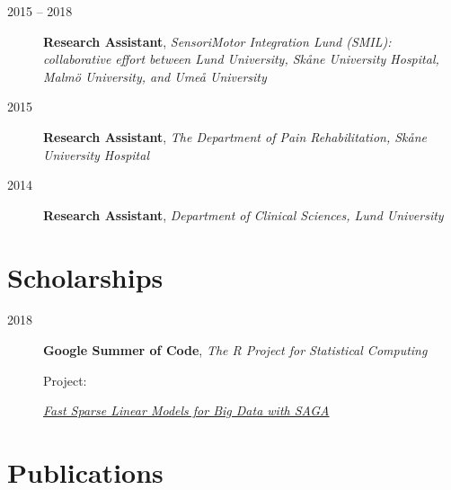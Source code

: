 \documentclass[
  10pt,
  headsepline=true,
  english,
  DIV=12
]{scrartcl}
\renewcommand*{%
  \mkbibnamegiven
}[1]{\ifitemannotation{highlight}{\textbf{#1}}{#1}}
\renewcommand*{%
  \mkbibnamefamily
}[1]{\ifitemannotation{highlight}{\textbf{#1}}{#1}}
\begin{document}
\begin{description}
  \item[2015 -- 2018] {
        \textbf{Research Assistant}, \emph{SensoriMotor Integration Lund
          (SMIL): collaborative effort between Lund University, Skåne
          University
          Hospital, Malmö University, and Umeå University}
        }
  \item[2015] {
        \textbf{Research Assistant}, \emph{The Department of Pain
          Rehabilitation, Skåne University Hospital}

        }
  \item[2014] {
        \textbf{Research Assistant}, \emph{Department of Clinical Sciences,
          Lund University}

        }
\end{description}

\section{Scholarships}
\begin{description}
  \item[2018] {
        \textbf{Google Summer of Code}, \emph{The R Project for Statistical
          Computing}

        Project:

        \emph{\href{https://summerofcode.withgoogle.com/archive/2018/projects/6276491595743232/}{Fast
            Sparse Linear Models for Big Data with SAGA}}
        }
\end{description}

\hypertarget{publications}{%
  \section{Publications}\label{publications}}

\nocite{*}

\printbibliography[title=Published
  Articles,heading=subbibnumbered,keyword=published-article]
\printbibliography[title=Unpublished
  Articles,heading=subbibnumbered,keyword=unpublished-article]
\printbibliography[title=Theses,heading=subbibnumbered,keyword=thesis]
\printbibliography[title=Conference
  Abstracts,heading=subbibnumbered,keyword=conference-abstract]
\end{document}
